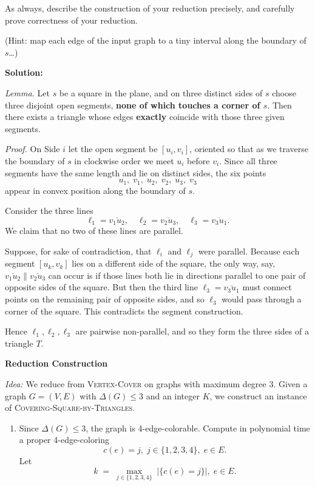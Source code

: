 \documentclass[11pt]{article}
\begin{document}
\begin{description}
As always, describe the construction of your reduction precisely, and carefully prove correctness of your reduction.

(Hint: map each edge of the input graph to a tiny interval along the boundary of $s$\ldots)

\newpage
\textbf{Solution:}

\textit{Lemma.} Let \(s\) be a square in the plane, and on three distinct sides of \(s\) choose three disjoint open segments, \textbf{none of which touches a corner of \(s\)}. Then there exists a  triangle whose edges \textbf{exactly} coincide with those three given segments.

\textit{Proof.} On Side \(i\) let the open segment be \([u_i,v_i]\), oriented so that as we traverse the boundary of \(s\) in clockwise order we meet \(u_i\) before \(v_i\). Since all three segments have the same length and lie on distinct sides, the six points
\[
u_1,\;v_1,\;u_2,\;v_2,\;u_3,\;v_3
\]
appear in convex position along the boundary of \(s\).

Consider the three lines
\[
\ell_1 = \overline{v_1u_2},\quad
\ell_2 = \overline{v_2u_3},\quad
\ell_3 = \overline{v_3u_1}.
\]
We claim that no two of these lines are parallel. 

Suppose, for sake of contradiction, that \(\ell_i\) and \(\ell_j\) were parallel.  Because each segment \([u_k,v_k]\) lies on a different side of the square, the only way, say, \(\overline{v_1u_2}\parallel\overline{v_2u_3}\) can occur is if those lines both lie in directions parallel to one pair of opposite sides of the square. But then the third line \(\ell_3=\overline{v_3u_1}\) must connect points on the remaining pair of opposite sides, and so \(\ell_3\) would pass through a corner of the square. This contradicts the segment construction.

Hence \(\ell_1,\ell_2,\ell_3\) are pairwise non-parallel, and so they form the three sides of a triangle \(T\).

\textbf{Reduction Construction}

\textit{Idea:} We reduce from \textsc{Vertex-Cover} on graphs with maximum degree 3. Given a graph $G=(V,E)$ with $\Delta(G)\leq3$ and an integer $K$, we construct an instance of \textsc{Covering-Square-by-Triangles}.

\begin{enumerate}
  \item[1.]
  Since $\Delta(G)\leq 3$, the graph is 4-edge-colorable.
  Compute in polynomial time a proper 4-edge-coloring
    \[
      c(e) = j, \; j \in \{1, 2, 3, 4\}, \; e \in E.
    \]
  Let
    \[
      k \;=\;\max_{j\in\{1,2,3,4\}}\;|\{c(e) = j\}|, \; e \in E.
    \]


\end{enumerate}
\end{description}
\end{document}
